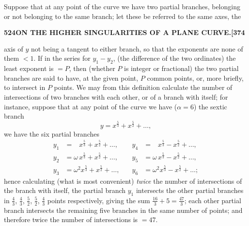 \documentclass[11pt,a4paper]{article}
\begin{document}
Suppose that at any point of the curve we have two partial branches, belonging or not belonging to the same branch; let these be referred to the same axes, the

\newpage
\noindent\textbf{524\hspace{1em}ON THE HIGHER SINGULARITIES OF A PLANE CURVE.\hfill[374}

\vspace{12pt}

\noindent
axis of $y$ not being a tangent to either branch, so that the exponents are none of them $< 1$. If in the series for $y_{1} - y_{2}$, (the difference of the two ordinates) the least exponent is $= P$, then (whether $P$ is integer or fractional) the two partial branches are said to have, at the given point, $P$ common points, or, more briefly, to intersect in $P$ points. We may from this definition calculate the number of intersections of two branches with each other, or of a branch with itself; for instance, suppose that at any point of the curve we have ($\alpha = 6$) the sextic branch
\[
y = x^{\frac{5}{3}} + x^{\frac{5}{2}} + \ldots,
\]
we have the six partial branches
\begin{align*}
y_{1} &= \phantom{\omega}\,x^{\frac{5}{3}} + x^{\frac{5}{2}} + \ldots, & y_{4} &= \phantom{\omega}\,x^{\frac{5}{3}} - x^{\frac{5}{2}} + \ldots,\\
y_{2} &= \omega\,x^{\frac{5}{3}} + x^{\frac{5}{2}} + \ldots, & y_{5} &= \omega\,x^{\frac{5}{3}} - x^{\frac{5}{2}} + \ldots,\\
y_{3} &= \omega^{2}x^{\frac{5}{3}} + x^{\frac{5}{2}} + \ldots,\quad & y_{6} &= \omega^{2}x^{\frac{5}{3}} - x^{\frac{5}{2}} + \ldots;
\end{align*}
hence calculating (what is most convenient) \textit{twice} the number of intersections of the branch with itself, the partial branch $y_{1}$ intersects the other partial branches in $\tfrac{4}{3}$, $\tfrac{4}{3}$, $\tfrac{5}{2}$, $\tfrac{5}{2}$, $\tfrac{4}{3}$ points respectively, giving the sum $\tfrac{16}{3} + 5 = \tfrac{47}{3}$; each other partial branch intersects the remaining five branches in the same number of points; and therefore twice the number of intersections is $= 47$.
\end{document}

